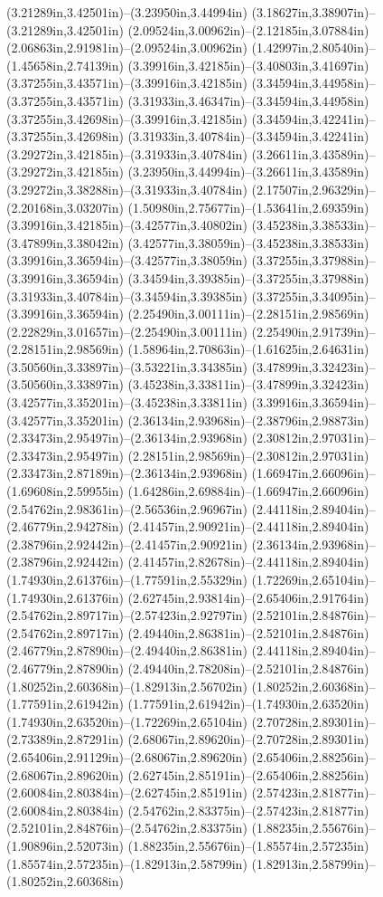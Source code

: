 (3.21289in,3.42501in)--(3.23950in,3.44994in) (3.18627in,3.38907in)--(3.21289in,3.42501in) (2.09524in,3.00962in)--(2.12185in,3.07884in) (2.06863in,2.91981in)--(2.09524in,3.00962in) (1.42997in,2.80540in)--(1.45658in,2.74139in) (3.39916in,3.42185in)--(3.40803in,3.41697in) (3.37255in,3.43571in)--(3.39916in,3.42185in) (3.34594in,3.44958in)--(3.37255in,3.43571in) (3.31933in,3.46347in)--(3.34594in,3.44958in) (3.37255in,3.42698in)--(3.39916in,3.42185in) (3.34594in,3.42241in)--(3.37255in,3.42698in) (3.31933in,3.40784in)--(3.34594in,3.42241in) (3.29272in,3.42185in)--(3.31933in,3.40784in) (3.26611in,3.43589in)--(3.29272in,3.42185in) (3.23950in,3.44994in)--(3.26611in,3.43589in) (3.29272in,3.38288in)--(3.31933in,3.40784in) (2.17507in,2.96329in)--(2.20168in,3.03207in) (1.50980in,2.75677in)--(1.53641in,2.69359in) (3.39916in,3.42185in)--(3.42577in,3.40802in) (3.45238in,3.38533in)--(3.47899in,3.38042in) (3.42577in,3.38059in)--(3.45238in,3.38533in) (3.39916in,3.36594in)--(3.42577in,3.38059in) (3.37255in,3.37988in)--(3.39916in,3.36594in) (3.34594in,3.39385in)--(3.37255in,3.37988in) (3.31933in,3.40784in)--(3.34594in,3.39385in) (3.37255in,3.34095in)--(3.39916in,3.36594in) (2.25490in,3.00111in)--(2.28151in,2.98569in) (2.22829in,3.01657in)--(2.25490in,3.00111in) (2.25490in,2.91739in)--(2.28151in,2.98569in) (1.58964in,2.70863in)--(1.61625in,2.64631in) (3.50560in,3.33897in)--(3.53221in,3.34385in) (3.47899in,3.32423in)--(3.50560in,3.33897in) (3.45238in,3.33811in)--(3.47899in,3.32423in) (3.42577in,3.35201in)--(3.45238in,3.33811in) (3.39916in,3.36594in)--(3.42577in,3.35201in) (2.36134in,2.93968in)--(2.38796in,2.98873in) (2.33473in,2.95497in)--(2.36134in,2.93968in) (2.30812in,2.97031in)--(2.33473in,2.95497in) (2.28151in,2.98569in)--(2.30812in,2.97031in) (2.33473in,2.87189in)--(2.36134in,2.93968in) (1.66947in,2.66096in)--(1.69608in,2.59955in) (1.64286in,2.69884in)--(1.66947in,2.66096in) (2.54762in,2.98361in)--(2.56536in,2.96967in) (2.44118in,2.89404in)--(2.46779in,2.94278in) (2.41457in,2.90921in)--(2.44118in,2.89404in) (2.38796in,2.92442in)--(2.41457in,2.90921in) (2.36134in,2.93968in)--(2.38796in,2.92442in) (2.41457in,2.82678in)--(2.44118in,2.89404in) (1.74930in,2.61376in)--(1.77591in,2.55329in) (1.72269in,2.65104in)--(1.74930in,2.61376in) (2.62745in,2.93814in)--(2.65406in,2.91764in) (2.54762in,2.89717in)--(2.57423in,2.92797in) (2.52101in,2.84876in)--(2.54762in,2.89717in) (2.49440in,2.86381in)--(2.52101in,2.84876in) (2.46779in,2.87890in)--(2.49440in,2.86381in) (2.44118in,2.89404in)--(2.46779in,2.87890in) (2.49440in,2.78208in)--(2.52101in,2.84876in) (1.80252in,2.60368in)--(1.82913in,2.56702in) (1.80252in,2.60368in)--(1.77591in,2.61942in) (1.77591in,2.61942in)--(1.74930in,2.63520in) (1.74930in,2.63520in)--(1.72269in,2.65104in) (2.70728in,2.89301in)--(2.73389in,2.87291in) (2.68067in,2.89620in)--(2.70728in,2.89301in) (2.65406in,2.91129in)--(2.68067in,2.89620in) (2.65406in,2.88256in)--(2.68067in,2.89620in) (2.62745in,2.85191in)--(2.65406in,2.88256in) (2.60084in,2.80384in)--(2.62745in,2.85191in) (2.57423in,2.81877in)--(2.60084in,2.80384in) (2.54762in,2.83375in)--(2.57423in,2.81877in) (2.52101in,2.84876in)--(2.54762in,2.83375in) (1.88235in,2.55676in)--(1.90896in,2.52073in) (1.88235in,2.55676in)--(1.85574in,2.57235in) (1.85574in,2.57235in)--(1.82913in,2.58799in) (1.82913in,2.58799in)--(1.80252in,2.60368in) 